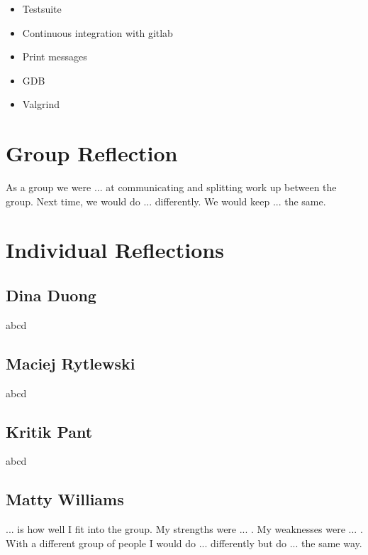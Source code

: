 \documentclass[11pt]{article}
\begin{document}
\begin{itemize}
    \item Testsuite
    \item Continuous integration with gitlab
    \item Print messages
    \item GDB
    \item Valgrind
\end{itemize}

\section{Group Reflection}

As a group we were ... at communicating and splitting work up between the group.
Next time, we would do ... differently. We would keep ... the same.

\section{Individual Reflections}

\subsection{Dina Duong}

abcd

\subsection{Maciej Rytlewski}

abcd

\subsection{Kritik Pant}

abcd

\subsection{Matty Williams}

... is how well I fit into the group.
My strengths were ... .
My weaknesses were ... .
With a different group of people I would do ... differently but do ... the same way. 
\end{document}
